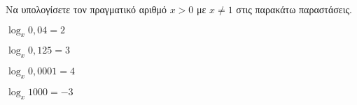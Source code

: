 Να υπολογίσετε τον πραγματικό αριθμό $ x>0$ με $ x\neq 1 $ στις παρακάτω παραστάσεις.
\begin{multicols}{2}
\begin{rlist}
\item $ \log_{x}{0{,}04}=2 $
\item $ \log_{x}{0{,}125}=3 $
\item $ \log_{x}{0{,}0001}=4 $
\item $ \log_{x}{1000}=-3 $
\end{rlist}
\end{multicols}
